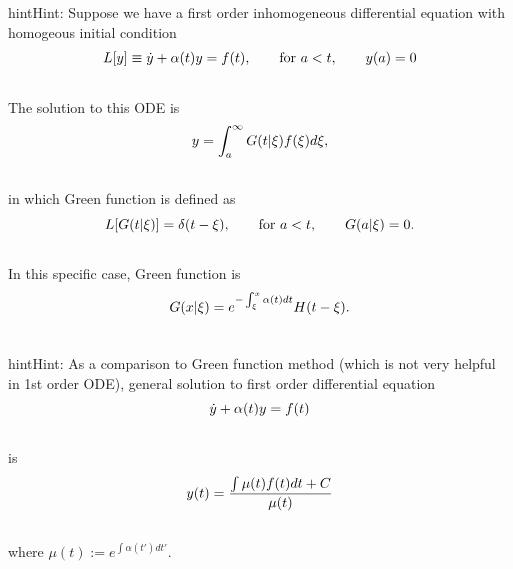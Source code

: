 \documentclass[letterpaper,10pt,english]{sphinxmanual}
\begin{document}
\begin{notice}{hint}{Hint:}
Suppose we have a first order inhomogeneous differential equation with homogeous initial condition
\begin{gather}
\begin{split}L[y]\equiv \dot y + \alpha(t)y = f(t), \qquad \text{for } a < t, \qquad y(a) = 0\end{split}\notag\\\begin{split}\end{split}\notag
\end{gather}
The solution to this ODE is
\begin{gather}
\begin{split}y = \int_a^\infty G(t\vert \xi)f (\xi) d\xi,\end{split}\notag\\\begin{split}\end{split}\notag
\end{gather}
in which Green function is defined as
\begin{gather}
\begin{split}L[G(t\vert \xi)] = \delta(t - \xi), \qquad \text{for } a < t, \qquad G(a\vert \xi) = 0.\end{split}\notag\\\begin{split}\end{split}\notag
\end{gather}
In this specific case, Green function is
\begin{gather}
\begin{split}G(x\vert \xi) = e^{-\int_\xi^x \alpha(t) dt} H(t - \xi) .\end{split}\notag\\\begin{split}\end{split}\notag
\end{gather}\end{notice}

\begin{notice}{hint}{Hint:}
As a comparison to Green function method (which is not very helpful in 1st order ODE), general solution to first order differential equation
\begin{gather}
\begin{split}\dot y + \alpha(t)y = f(t)\end{split}\notag\\\begin{split}\end{split}\notag
\end{gather}
is
\begin{gather}
\begin{split}y(t) = \frac{\int\mu(t) f(t) dt + C}{\mu(t)}\end{split}\notag\\\begin{split}\end{split}\notag
\end{gather}
where $\mu(t) := e^{\int \alpha(t') dt'}$.
\end{notice}
\end{document}
